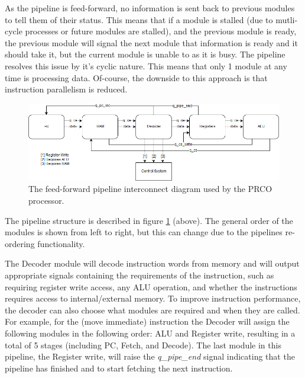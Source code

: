 \documentclass[11pt,a4paper]{article}
\newcommand{\scname}{PRCO}
\begin{document}
As the pipeline is feed-forward, no information is sent back to previous modules to tell them of their status. This means that if a module is stalled (due to mutli-cycle processes or future modules are stalled), and the previous module is ready, the previous module will signal the next module that information is ready and it should take it, but the current module is unable to as it is busy. The pipeline resolves this issue by it's cyclic nature. This means that only 1 module at any time is processing data. Of-course, the downside to this approach is that instruction parallelism is reduced.

\begin{figure}[ht]
\centering
     \includegraphics[width=1.0\textwidth]{prco_forward_pipe}
      \caption{The feed-forward pipeline interconnect diagram used by the \scname{} processor.}
       \label{fig:prco_forward_pipe}
\end{figure}

The pipeline structure is described in figure \ref{fig:prco_forward_pipe} (above). The general order of the modules is shown from left to right, but this can change due to the pipelines re-ordering functionality.

The Decoder module will decode instruction words from memory and will output appropriate signals containing the requirements of the instruction, such as requiring register write access, any ALU operation, and whether the instructions requires access to internal/external memory.
\newline\newline
To improve instruction performance, the decoder can also choose what modules are required and when they are called. For example, for the {} (move immediate) instruction the Decoder will assign the following modules in the following order: ALU and Register write, resulting in a total of 5 stages (including PC, Fetch, and Decode). The last module in this pipeline, the Register write, will raise the \textit{q\_pipe\_end} signal indicating that the pipeline has finished and to start fetching the next instruction.
\end{document}
